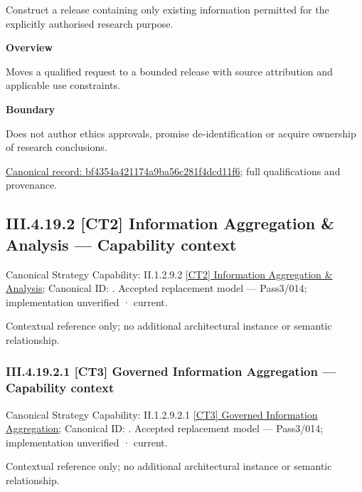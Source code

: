 Construct a release containing only existing information permitted for the explicitly authorised research purpose.



\textbf{Overview}



Moves a qualified request to a bounded release with source attribution and applicable use constraints.



\textbf{Boundary}



Does not author ethics approvals, promise de-identification or acquire ownership of research conclusions.


{\footnotesize \href{../../../../../../../../continuum/business/business-function/bf4354a421174a9ba56c281f4dcd11f6.md}{Canonical record: bf4354a421174a9ba56c281f4dcd11f6}; full qualifications and provenance.}\par
\subsection*{III.4.19.2 [CT2] Information Aggregation \& Analysis — Capability context}
\label{navigation:III.4.19.2}

{\small Canonical Strategy Capability: II.1.2.9.2 \hyperref[element:1387ed8b07444d06a10eb60a47d5af8a]{[CT2] Information Aggregation \& Analysis}; Canonical ID: \texttt{}. Accepted replacement model — Pass3/014; implementation unverified · current.}\par
Contextual reference only; no additional architectural instance or semantic relationship.\par
\subsubsection*{III.4.19.2.1 [CT3] Governed Information Aggregation — Capability context}
\label{navigation:III.4.19.2.1}

{\small Canonical Strategy Capability: II.1.2.9.2.1 \hyperref[element:97909bca83fd4ece8d35e64243923b9d]{[CT3] Governed Information Aggregation}; Canonical ID: \texttt{}. Accepted replacement model — Pass3/014; implementation unverified · current.}\par
Contextual reference only; no additional architectural instance or semantic relationship.\par
